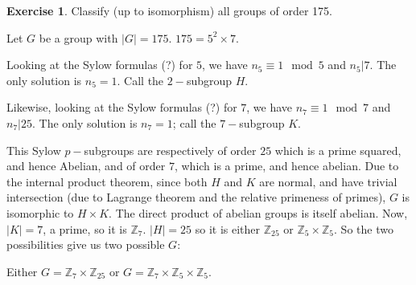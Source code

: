 \documentclass[11pt,oneside]{article}
\numberwithin{equation}{section}
\theoremstyle{definition}
\newtheorem{exercise}{Exercise}
\def\ZZ{\mathbb{Z}}
\begin{document}
\begin{exercise}
  Classify (up to isomorphism) all groups of order 175. 
\end{exercise}
\begin{solution}
  Let $G$ be a group with $|G| = 175$.  $175 = 5^2 \times 7$.

  Looking at the Sylow formulas (?) for $5$, we have $n_5 \equiv 1 \mod{5}$ and
  $n_5 | 7$. The only solution is $n_5 = 1$.  Call the $2-$subgroup $H$.  

  Likewise, looking at the Sylow formulas (?) for $7$, we have $n_7 \equiv 1 \mod{7}$ and
  $n_7 | 25$. The only solution is $n_7 = 1$; call the $7-$subgroup $K$.  

  This Sylow $p-$subgroups are respectively of order $25$ which is a
  prime squared, and hence Abelian, and of order $7$, which is a
  prime, and hence abelian. Due to the internal product theorem, since
  both $H$ and $K$ are normal, and have trivial intersection (due to
  Lagrange theorem and the relative primeness of primes), $G$ is
  isomorphic to $H \times K$.  The direct product of abelian groups is
  itself abelian.  Now, $|K| = 7$, a prime, so it is $\ZZ_7$.  $|H| =
  25$ so it is either $\ZZ_{25}$ or $\ZZ_5 \times \ZZ_5$.  So the two
  possibilities give us two possible $G$:

  Either $G = \ZZ_7 \times \ZZ_{25}$ or $G = \ZZ_7 \times \ZZ_5 \times \ZZ_5$.

\end{solution}
\end{document}
